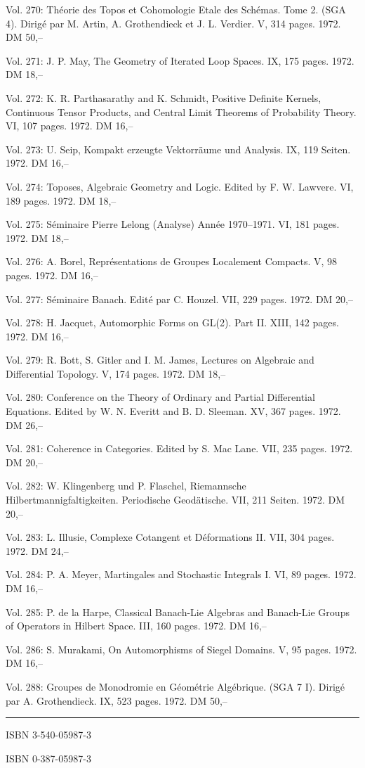 Vol. 270: Théorie des Topos et Cohomologie Etale des Schémas. Tome 2. (SGA 4). Dirigé par M. Artin, A. Grothendieck et J. L. Verdier. V, 314 pages. 1972. DM 50,--

Vol. 271: J. P. May, The Geometry of Iterated Loop Spaces. IX, 175 pages. 1972. DM 18,--

Vol. 272: K. R. Parthasarathy and K. Schmidt, Positive Definite Kernels, Continuous Tensor Products, and Central Limit Theorems of Probability Theory. VI, 107 pages. 1972. DM 16,--

Vol. 273: U. Seip, Kompakt erzeugte Vektorräume und Analysis. IX, 119 Seiten. 1972. DM 16,--

Vol. 274: Toposes, Algebraic Geometry and Logic. Edited by F. W. Lawvere. VI, 189 pages. 1972. DM 18,--

Vol. 275: Séminaire Pierre Lelong (Analyse) Année 1970--1971. VI, 181 pages. 1972. DM 18,--

Vol. 276: A. Borel, Représentations de Groupes Localement Compacts. V, 98 pages. 1972. DM 16,--

Vol. 277: Séminaire Banach. Edité par C. Houzel. VII, 229 pages. 1972. DM 20,--

Vol. 278: H. Jacquet, Automorphic Forms on GL(2). Part II. XIII, 142 pages. 1972. DM 16,--

Vol. 279: R. Bott, S. Gitler and I. M. James, Lectures on Algebraic and Differential Topology. V, 174 pages. 1972. DM 18,--

Vol. 280: Conference on the Theory of Ordinary and Partial Differential Equations. Edited by W. N. Everitt and B. D. Sleeman. XV, 367 pages. 1972. DM 26,--

Vol. 281: Coherence in Categories. Edited by S. Mac Lane. VII, 235 pages. 1972. DM 20,--

Vol. 282: W. Klingenberg und P. Flaschel, Riemannsche Hilbertmannigfaltigkeiten. Periodische Geodätische. VII, 211 Seiten. 1972. DM 20,--

Vol. 283: L. Illusie, Complexe Cotangent et Déformations II. VII, 304 pages. 1972. DM 24,--

Vol. 284: P. A. Meyer, Martingales and Stochastic Integrals I. VI, 89 pages. 1972. DM 16,--

Vol. 285: P. de la Harpe, Classical Banach-Lie Algebras and Banach-Lie Groups of Operators in Hilbert Space. III, 160 pages. 1972. DM 16,--

Vol. 286: S. Murakami, On Automorphisms of Siegel Domains. V, 95 pages. 1972. DM 16,--

Vol. 288: Groupes de Monodromie en Géométrie Algébrique. (SGA 7 I). Dirigé par A. Grothendieck. IX, 523 pages. 1972. DM 50,--

\noindent\rule{\linewidth}{0.4pt}



ISBN 3-540-05987-3

ISBN 0-387-05987-3
\endgroup

